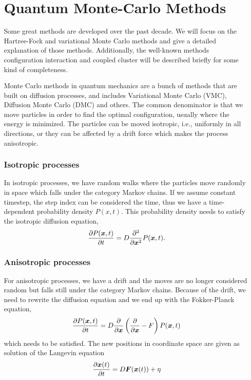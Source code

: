 \chapter{Quantum Monte-Carlo Methods} \label{sec:methods}
Some great methods are developed over the past decade. We will focus on the Hartree-Fock and variational Monte Carlo methods and give a detailed explanation of those methods. Additionally, the well-known methods configuration interaction and coupled cluster will be described briefly for some kind of completeness. 

Monte Carlo methods in quantum mechanics are a bunch of methods that are built on diffusion processes, and includes Variational Monte Carlo (VMC), Diffusion Monte Carlo (DMC) and others. The common denominator is that we move particles in order to find the optimal configuration, usually where the energy is minimized. The particles can be moved isotropic, i.e., uniformly in all directions, or they can be affected by a drift force which makes the process anisotropic. 

\subsection{Isotropic processes}
In isotropic processes, we have random walks where the particles move randomly in space which falls under the category Markov chains. If we assume constant timestep, the step index can be considered the time, thus we have a time-dependent probability density $P(x,t)$. This probability density needs to satisfy the isotropic diffusion equation,
\begin{equation}
\frac{\partial P(\boldsymbol{{x}},t)}{\partial t}=D\frac{\partial^2}{\partial \boldsymbol{{x}}^2}P(\boldsymbol{{x}},t).
\end{equation}

\subsection{Anisotropic processes}
For anisotropic processes, we have a drift and the moves are no longer considered random but falls still under the category Markov chains. Because of the drift, we need to rewrite the diffusion equation and we end up with the Fokker-Planck equation,
\begin{equation}
\frac{\partial P(\boldsymbol{{x}},t)}{\partial t}=D\frac{\partial}{\partial \boldsymbol{{x}}}\left(\frac{\partial}{\partial \boldsymbol{{x}}}-F\right)P(\boldsymbol{{x}},t)
\end{equation}
which needs to be satisfied. The new positions in coordinate space are given as solution of the Langevin equation 
\begin{equation}
\frac{\partial \boldsymbol{{x}}(t)}{\partial t}=D\boldsymbol{{F}}(\boldsymbol{{x}}(t))+\eta
\end{equation}

